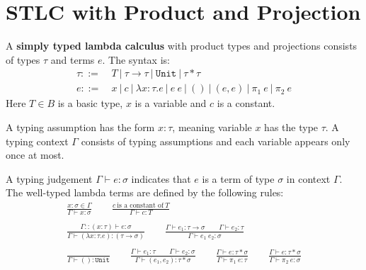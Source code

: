 
\section{STLC with Product and Projection}

\begin{definition}
    A \textbf{simply typed lambda calculus} with product types and projections consists of types $\tau$ and terms $e$. The syntax is:
    \begin{align*}
        \tau ::=&\ T\ |\ \tau \to \tau\ |\ \texttt{Unit}\ |\ \tau * \tau \\
        e ::=&\ x\ |\ c\ |\ \lambda x : \tau. e\ |\ e\ e\ |\ ()\ |\ (e, e)\ |\ \pi_1\ e\ |\ \pi_2\ e
    \end{align*}
    Here $T \in B$ is a basic type, $x$ is a variable and $c$ is a constant.
\end{definition}

\begin{definition}
    A typing assumption has the form $x : \tau$, meaning variable $x$ has the type $\tau$. A typing context $\Gamma$ consists of typing assumptions and each variable appears only once at most.

    A typing judgement $\Gamma \vdash e : \sigma$ indicates that $e$ is a term of type $\sigma$ in context $\Gamma$. The well-typed lambda terms are defined by the following rules:
    \begin{gather*}
        \frac{x : \sigma \in \Gamma}{\Gamma \vdash x : \sigma}
        \qquad \frac{c\ \textrm{is a constant of}\ T}{\Gamma \vdash c : T}\\
        \ \\
        \frac{\Gamma::(x : \tau) \vdash e : \sigma}{\Gamma \vdash (\lambda x : \tau.e) : (\tau \to \sigma)}
        \qquad \frac{\Gamma \vdash e_1 : \tau \to \sigma \qquad \Gamma \vdash e_2 : \tau}{\Gamma \vdash e_1\ e_2 : \sigma}\\
        \ \\
        \frac{}{\Gamma \vdash () : \texttt{Unit}}
        \qquad \frac{\Gamma \vdash e_1 : \tau \qquad \Gamma \vdash e_2 : \sigma}{\Gamma \vdash (e_1, e_2) : \tau * \sigma}
        \qquad \frac{\Gamma \vdash e : \tau * \sigma}{\Gamma \vdash \pi_1\ e : \tau}
        \qquad \frac{\Gamma \vdash e : \tau * \sigma}{\Gamma \vdash \pi_2\ e : \sigma}
    \end{gather*}
\end{definition}

